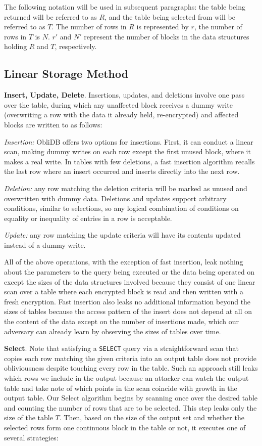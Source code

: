 \documentclass[letterpaper,twocolumn,10pt]{article}
\def\name/{ObliDB}
\begin{document}
The following notation will be used in subsequent paragraphs: the table being returned will be referred to as $R$, and the table being selected from will be referred to as $T$. The number of rows in $R$ is represented by $r$, the number of rows in $T$ is $N$. $r'$ and $N'$ represent the number of blocks in the data structures holding $R$ and $T$, respectively.

\subsection{Linear Storage Method}
  \noindent \textbf{Insert, Update, Delete}.
Insertions, updates, and deletions involve one pass over the table, during which any unaffected block receives a dummy write (overwriting a row with the data it already held, re-encrypted) and affected blocks are written to as follows:

\emph{Insertion:} \name/ offers two options for insertions. First, it can conduct a linear scan, making dummy writes on each row except the first unused block, where it makes a real write. In tables with few deletions, a fast insertion algorithm recalls the last row where an insert occurred and inserts directly into the next row.

\emph{Deletion:} any row matching the deletion criteria will be marked as unused and overwritten with dummy data. Deletions and updates support arbitrary conditions, similar to selections, so any logical combination of conditions on equality or inequality of entries in a row is acceptable.

\emph{Update:} any row matching the update criteria will have its contents updated instead of a dummy write.


All of the above operations, with the exception of fast insertion, leak nothing about the parameters to the query being executed or the data being operated on except the sizes of the data structures involved because they consist of one linear scan over a table where each encrypted block is read and then written with a fresh encryption. Fast insertion also leaks no additional information beyond the sizes of tables because the access pattern of the insert does not depend at all on the content of the data except on the number of insertions made, which our adversary can already learn by observing the sizes of tables over time.

  \noindent \textbf{Select}.
Note that satisfying a \texttt{SELECT} query via a straightforward scan that copies each row matching the given criteria into an output table does not provide obliviousness despite touching every row in the table. Such an approach still leaks which rows we include in the output because an attacker can watch the output table and take note of which points in the scan coincide with growth in the output table. Our Select algorithm begins by scanning once over the desired table and counting the number of rows that are to be selected. This step leaks only the size of the table $T$. Then, based on the size of the output set and whether the selected rows form one continuous block in the table or not, it executes one of several strategies:
\end{document}
